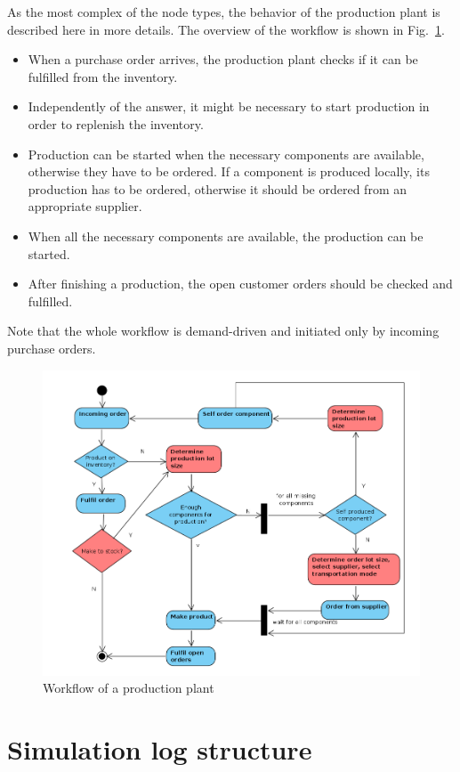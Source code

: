 \documentclass{article}
\begin{document}
As the most complex of the node types, the behavior of the production plant is described here in more details. The overview of the workflow is shown in Fig.~\ref{fig:factory_logic}.
\begin{itemize}
\item When a purchase order arrives, the production plant checks if it can be fulfilled from the inventory.
\item Independently of the answer, it might be necessary to start production in order to replenish the inventory.
\item Production can be started when the necessary components are available, otherwise they have to be ordered. If a component is produced locally, its production has to be ordered, otherwise it should be ordered from an appropriate supplier.
\item When all the necessary components are available, the production can be started.
\item After finishing a production, the open customer orders should be checked and fulfilled.
\end{itemize}

Note that the whole workflow is demand-driven and initiated only by incoming purchase orders.

\begin{figure}[ht!]
	\center
	\includegraphics[width=\textwidth]{factory_logic.png} 
	\caption{Workflow of a production plant}\label{fig:factory_logic}
\end{figure}


\section{Simulation log structure\label{sec:log}}
\end{document}
